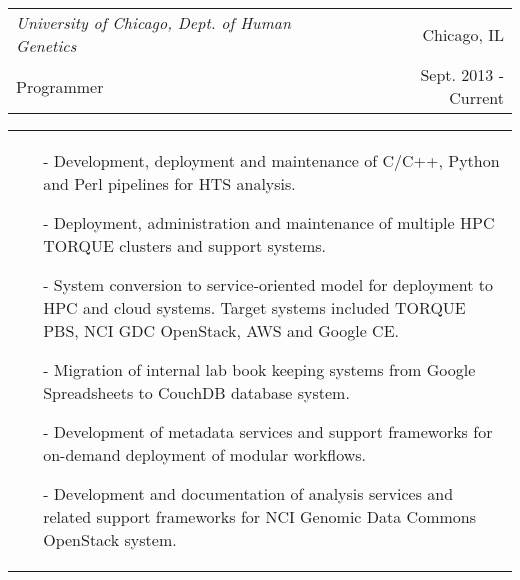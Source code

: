 \begin{tabularx}{\textwidth}{ L R }
  \textit{University of Chicago, Dept. of Human Genetics} & Chicago, IL \\
  Programmer & Sept. 2013 - Current \\
\end{tabularx}
\begin{tabularx}{\textwidth}{ X }
  \begin{itemize}
    \itemsep{}
    \item[-] Development, deployment and maintenance of C/C++, Python and Perl pipelines for HTS analysis.
    \item[-] Deployment, administration and maintenance of multiple HPC TORQUE clusters and support systems.
    \item[-] System conversion to service-oriented model for deployment to HPC and cloud systems. Target systems included TORQUE PBS, NCI GDC OpenStack, AWS and Google CE.
    \item[-] Migration of internal lab book keeping systems from Google Spreadsheets to CouchDB database system.
    \item[-] Development of metadata services and support frameworks for on-demand deployment of modular workflows.
    \item[-] Development and documentation of analysis services and related support frameworks for NCI Genomic Data Commons OpenStack system.
  \end{itemize}
\end{tabularx}
